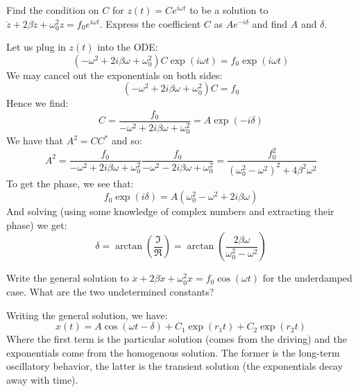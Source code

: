 \begin{p}
Find the condition on $C$ for $z(t) = Ce^{i\omega t}$ to be a solution to $\ddot{z} + 2\beta\dot{z} + \omega_0^2z = f_0e^{i\omega t}$. Express the coefficient $C$ as $Ae^{-i\delta}$ and find $A$ and $\delta$.
\end{p}
\begin{s}
Let us plug in $z(t)$ into the ODE:
\[(-\omega^2 + 2i\beta\omega + \omega_0^2)C\exp(i\omega t) = f_0\exp(i\omega t)\]
We may cancel out the exponentials on both sides:
\[(-\omega^2 + 2i\beta\omega + \omega_0^2)C =f_0\]
Hence we find:
\[C = \frac{f_0}{-\omega^2 + 2i\beta\omega + \omega_0^2} = A\exp(-i\delta)\]
We have that $A^2 = CC^*$ and so:
\[A^2 = \frac{f_0}{-\omega^2 + 2i\beta\omega + \omega_0^2}\frac{f_0}{-\omega^2 - 2i\beta\omega + \omega_0^2} = \frac{f_0^2}{(\omega_0^2 - \omega^2)^2 + 4\beta^2\omega^2}\]
To get the phase, we see that:
\[f_0\exp(i\delta) = A(\omega_0^2 - \omega^2 + 2i\beta\omega)\]
And solving (using some knowledge of complex numbers and extracting their phase) we get:
\[\delta = \arctan(\frac{\Im}{\Re}) = \arctan(\frac{2\beta \omega}{\omega_0^2 - \omega^2})\]
\end{s}

\begin{p}
Write the general solution to $\ddot{x} + 2\beta\dot{x} + \omega_0^2x = f_0\cos(\omega t)$ for the underdamped case. What are the two undetermined constants?
\end{p}
\begin{s}
Writing the general solution, we have:
\[x(t) = A\cos(\omega t -\delta) + C_1\exp(r_1 t) + C_2\exp(r_2 t)\]
Where the first term is the particular solution (comes from the driving) and the exponentials come from the homogenous solution. The former is the long-term oscillatory behavior, the latter is the transient solution (the exponentials decay away with time).
\end{s}


